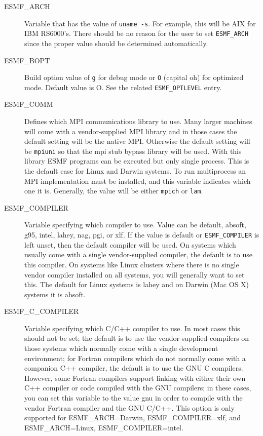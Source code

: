 \begin{description}

\item[ESMF\_ARCH] 

Variable that has the value of {\tt uname -s}.  For example, this will be
AIX for IBM RS6000's.  There should be no reason for the user to set 
{\tt ESMF\_ARCH} since the proper value should be determined automatically.

\item[ESMF\_BOPT] 

Build option value of {\tt g} for debug mode or {\tt O} (capital oh) for
optimized mode.  Default value is O.  See the related {\tt ESMF\_OPTLEVEL}
entry.

\item[ESMF\_COMM] 

Defines which MPI communications library to use.  Many larger machines
will come with a vendor-supplied  MPI library and in those cases the
default setting will be the native MPI.  Otherwise the default setting will
be {\tt mpiuni} so that the mpi stub bypass library will be used.  
With this library ESMF programs can be executed but only single process.
This is the default case for Linux and Darwin systems.  
To run multiprocess an MPI implementation must be installed, and this
variable indicates which one it is.  Generally, the value will be either
{\tt mpich} or {\tt lam}.

\item[ESMF\_COMPILER]

Variable specifying which compiler to use.  Value can be default,
absoft, g95, intel, lahey, nag, pgi, or xlf.  If the value is default 
or {\tt ESMF\_COMPILER} is left unset, then the default compiler will be
used. On systems which usually come with a single vendor-supplied
compiler, the default is to use this compiler.  On systems like
Linux clusters where there is no single vendor compiler installed
on all systems, you will generally want to set this.
The default for Linux systems is lahey and on Darwin (Mac OS X)
systems it is absoft.

\item[ESMF\_C\_COMPILER]

Variable specifying which C/C++ compiler to use.   In most cases
this should not be set; the default is to use the vendor-supplied
compilers on those systems which normally come with a single
development environment; for Fortran compilers which do not normally
come with a companion C++ compiler, the default is to use the GNU C compilers.
However, some Fortran compilers support linking with either their
own C++ compiler or code compiled with the GNU compilers; 
in these cases, you can set this variable
to the value gnu in order to compile with the vendor Fortran
compiler and the GNU C/C++.   This option is only supported for
ESMF\_ARCH=Darwin, ESMF\_COMPILER=xlf, and ESMF\_ARCH=Linux,
ESMF\_COMPILER=intel.


\end{description}
